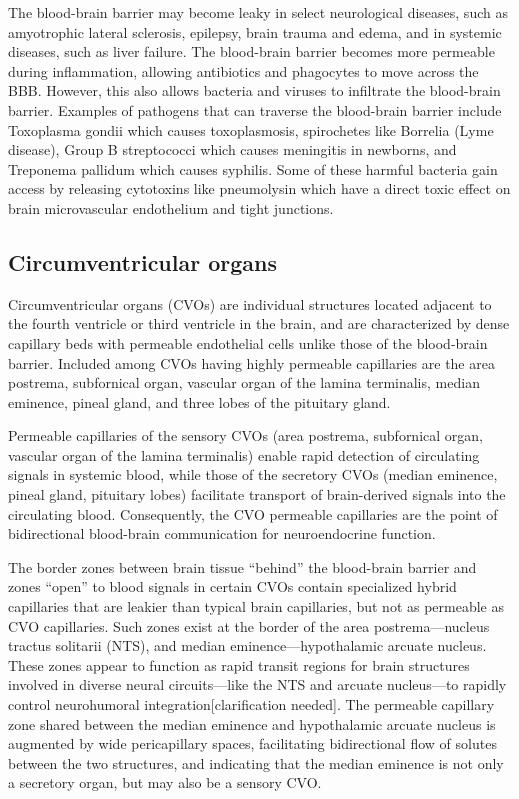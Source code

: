 The blood-brain barrier may become leaky in select neurological diseases, such as amyotrophic lateral sclerosis, epilepsy, brain trauma and edema, and in systemic diseases, such as liver failure. The blood-brain barrier becomes more permeable during inflammation, allowing antibiotics and phagocytes to move across the BBB. However, this also allows bacteria and viruses to infiltrate the blood-brain barrier. Examples of pathogens that can traverse the blood-brain barrier include Toxoplasma gondii which causes toxoplasmosis, spirochetes like Borrelia (Lyme disease), Group B streptococci which causes meningitis in newborns, and Treponema pallidum which causes syphilis. Some of these harmful bacteria gain access by releasing cytotoxins like pneumolysin which have a direct toxic effect on brain microvascular endothelium and tight junctions.

\hypertarget{circumventricular-organs}{%
\subsection{Circumventricular organs}\label{circumventricular-organs}}

Circumventricular organs (CVOs) are individual structures located adjacent to the fourth ventricle or third ventricle in the brain, and are characterized by dense capillary beds with permeable endothelial cells unlike those of the blood-brain barrier. Included among CVOs having highly permeable capillaries are the area postrema, subfornical organ, vascular organ of the lamina terminalis, median eminence, pineal gland, and three lobes of the pituitary gland.

Permeable capillaries of the sensory CVOs (area postrema, subfornical organ, vascular organ of the lamina terminalis) enable rapid detection of circulating signals in systemic blood, while those of the secretory CVOs (median eminence, pineal gland, pituitary lobes) facilitate transport of brain-derived signals into the circulating blood. Consequently, the CVO permeable capillaries are the point of bidirectional blood-brain communication for neuroendocrine function.

The border zones between brain tissue ``behind'' the blood-brain barrier and zones ``open'' to blood signals in certain CVOs contain specialized hybrid capillaries that are leakier than typical brain capillaries, but not as permeable as CVO capillaries. Such zones exist at the border of the area postrema---nucleus tractus solitarii (NTS), and median eminence---hypothalamic arcuate nucleus. These zones appear to function as rapid transit regions for brain structures involved in diverse neural circuits---like the NTS and arcuate nucleus---to rapidly control neurohumoral integration{[}clarification needed{]}. The permeable capillary zone shared between the median eminence and hypothalamic arcuate nucleus is augmented by wide pericapillary spaces, facilitating bidirectional flow of solutes between the two structures, and indicating that the median eminence is not only a secretory organ, but may also be a sensory CVO.

